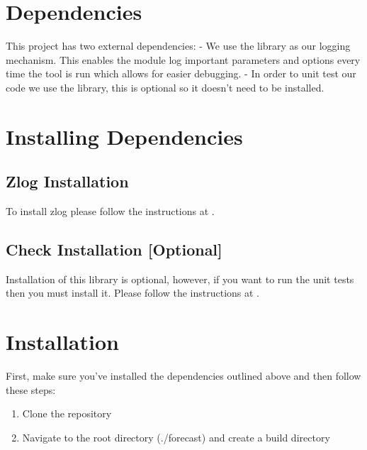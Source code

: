 \documentclass[letterpaper,10pt,english]{sphinxmanual}
\begin{document}
\section{Dependencies}
\label{\detokenize{build:dependencies}}
This project has two external dependencies:
- We use the  library as our logging mechanism. This enables the module log important parameters and options
every time the tool is run which allows for easier debugging.
- In order to unit test our code we use the  library, this is optional so it doesn't need to be installed.


\section{Installing Dependencies}
\label{\detokenize{build:installing-dependencies}}

\subsection{Zlog Installation}
\label{\detokenize{build:zlog-installation}}
To install zlog please follow the instructions at .


\subsection{Check Installation {[}Optional{]}}
\label{\detokenize{build:check-installation-optional}}
Installation of this library is optional, however, if you want to run the unit tests then
you must install it. Please follow the instructions at .


\section{Installation}
\label{\detokenize{build:installation}}
First, make sure you've installed the dependencies outlined above and then follow these steps:
\begin{enumerate}
\item {} 
Clone the repository

\item {} 
Navigate to the root directory (./forecast) and create a build directory

\end{enumerate}
\end{document}
